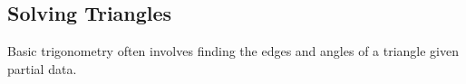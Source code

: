 % 


\subsection{Solving Triangles}

Basic trigonometry often involves finding the edges and angles of a triangle given partial data.

